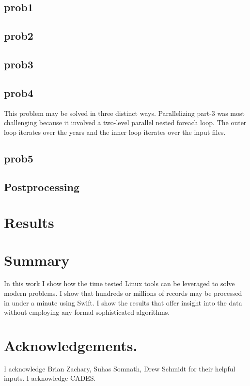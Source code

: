 \documentclass{report}
\begin{document}
\subsection*{prob1}

\subsection*{prob2}

\subsection*{prob3}

\subsection*{prob4}
This problem may be solved in three distinct ways. Parallelizing part-3 was
most challenging because it involved a two-level parallel nested foreach loop.
The outer loop iterates over the years and the inner loop iterates over the
input files.

\subsection*{prob5}

\subsection*{Postprocessing}

\section*{Results}

\section*{Summary}
In this work I show how the time tested Linux tools can be leveraged to solve
modern problems. I show that hundreds or millions of records may be processed
in under a minute using Swift. I show the results that offer insight into the
data without employing any formal sophisticated algorithms.

\section*{Acknowledgements.}
I acknowledge Brian Zachary, Suhas Somnath, Drew Schmidt for their helpful
inputs. I acknowledge CADES.
\end{document}
